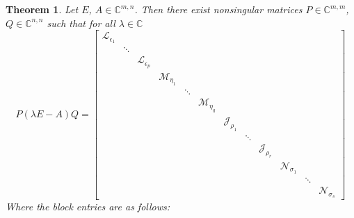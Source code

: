\documentclass[]{book}
\newtheorem{theorem}{Theorem}[chapter]
\theoremstyle{definition}
\theoremstyle{definition}
\theoremstyle{definition}
\theoremstyle{remark}
\begin{document}
\begin{theorem}
\protect\hypertarget{thm:kcf}{}{\label{thm:kcf} }
Let \(E\), \(A \in \mathbb C^{m,n}\). Then there exist nonsingular matrices \(P\in \mathbb C^{m,m}\), \(Q\in \mathbb C^{n,n}\) such that for all \(\lambda \in \mathbb C\)
\begin{equation*}
P(\lambda E -A)Q = 
\begin{bmatrix}
\mathcal L_{\epsilon_1} \\
& \ddots \\
&& \mathcal L_{\epsilon_p} \\
&&& \mathcal M_{\eta_1} \\
&&&& \ddots \\
&&&&& \mathcal M_{\eta_q} \\
&&&&&& \mathcal J_{\rho_1} \\
&&&&&&& \ddots \\
&&&&&&&& \mathcal J_{\rho_r} \\
&&&&&&&&& \mathcal N_{\sigma_1} \\
&&&&&&&&&& \ddots \\
&&&&&&&&&&& \mathcal N_{\sigma_s}
\end{bmatrix}
\end{equation*}
Where the block entries are as follows:


\end{theorem}
\end{document}
